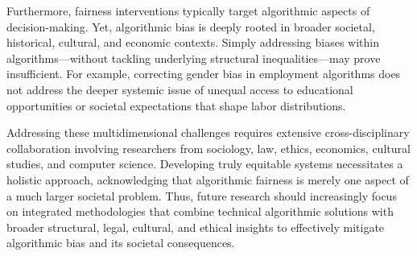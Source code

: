  Furthermore, fairness interventions typically target algorithmic aspects of decision-making. Yet, algorithmic bias is deeply rooted in broader societal, historical, cultural, and economic contexts. Simply addressing biases within algorithms—without tackling underlying structural inequalities—may prove insufficient. For example, correcting gender bias in employment algorithms does not address the deeper systemic issue of unequal access to educational opportunities or societal expectations that shape labor distributions.
 
 Addressing these multidimensional challenges requires extensive cross-disciplinary collaboration involving researchers from sociology, law, ethics, economics, cultural studies, and computer science. Developing truly equitable systems necessitates a holistic approach, acknowledging that algorithmic fairness is merely one aspect of a much larger societal problem. Thus, future research should increasingly focus on integrated methodologies that combine technical algorithmic solutions with broader structural, legal, cultural, and ethical insights to effectively mitigate algorithmic bias and its societal consequences.
 